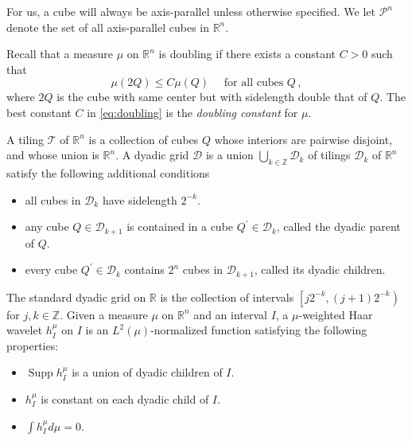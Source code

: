 \documentclass{amsart}%
\theoremstyle{plain}
\numberwithin{equation}{section}
\begin{document}
For us, a cube will always be axis-parallel unless otherwise specified. We let $\mathcal{P}^{n}$ denote the set of all axis-parallel cubes in $\mathbb{R}^{n}$.

Recall that a measure $\mu$ on $\mathbb{R}^{n}$ is doubling if there exists a
constant $C>0$ such that 
\begin{equation}\label{eq:doubling}
	\mu\left(  2 Q \right)  \leq C \mu\left(  Q \right) \quad \text{ for all cubes } Q \, ,
\end{equation}
where $2 Q$ is the cube with same center but with sidelength double that of $Q$. The best constant $C$ in \eqref{eq:doubling} is the
\emph{doubling constant} for $\mu$.

A tiling $\mathcal{T}$ of $\mathbb{R}^{n}$ is a collection
of cubes $Q$ whose interiors are pairwise disjoint, and whose union is
$\mathbb{R}^{n}$. A dyadic grid $\mathcal{D}$ is a union
$\bigcup\limits_{k \in\mathbb{Z}} \mathcal{D}_{k}$ of tilings $\mathcal{D}%
_{k}$ of $\mathbb{R}^{n}$ satisfy the
following additional conditions

\begin{itemize}
	\item all cubes in $\mathcal{D}_{k}$ have sidelength $2^{-k}$.

\item any cube $Q \in\mathcal{D}_{k+1}$ is contained in a cube $Q^{\prime}%
\in\mathcal{D}_{k}$, called the dyadic parent of $Q$.

\item every cube $Q^{\prime}\in\mathcal{D}_{k}$ contains  $2^{n}$ cubes 
in $\mathcal{D}_{k+1}$, called its dyadic children.
\end{itemize}

The standard dyadic grid on $\mathbb{R}$ is the collection
of intervals $\left[  j2^{-k},\left(  j+1\right)  2^{-k}\right)  $ for
$j,k\in\mathbb{Z}$. Given a measure $\mu$ on $\mathbb{R}^{n}$ and an interval
$I$, a $\mu$-weighted Haar wavelet $h_{I}^{\mu}$ on $I$ is an $L^2 \left (\mu \right )$-normalized 
function satisfying the following properties:

\begin{itemize}
\item $\operatorname*{Supp}h_{I}^{\mu}$ is a union of dyadic children of $I$.

\item $h_{I}^{\mu}$ is constant on each dyadic child of $I$.

\item $\int h_{I}^{\mu}d\mu=0$.
\end{itemize}
\end{document}
